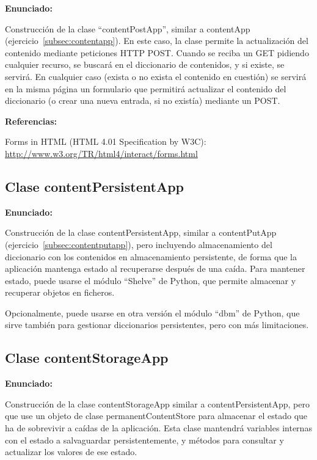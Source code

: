\textbf{Enunciado:}

Construcción de la clase ``contentPostApp'', similar a contentApp (ejercicio~\ref{subsec:contentapp}). En este caso, la clase permite la actualización del contenido mediante peticiones HTTP POST. Cuando se reciba un GET pidiendo cualquier recurso, se buscará en el diccionario de contenidos, y si existe, se servirá. En cualquier caso (exista o no exista el contenido en cuestión) se servirá en la misma página un formulario que permitirá actualizar el contenido del diccionario (o crear una nueva entrada, si no existía) mediante un POST.

\textbf{Referencias:}

Forms in HTML (HTML 4.01 Specification by W3C): \\
\url{http://www.w3.org/TR/html4/interact/forms.html}

\subsection{Clase contentPersistentApp}
\label{subsec:contentpersistentapp}

\textbf{Enunciado:}

Construcción de la clase contentPersistentApp, similar a contentPutApp (ejercicio~\ref{subsec:contentputapp}), pero incluyendo almacenamiento del diccionario con los contenidos en almacenamiento persistente, de forma que la aplicación mantenga estado al recuperarse después de una caída. Para mantener estado, puede usarse el módulo ``Shelve'' de Python, que permite almacenar y recuperar objetos en ficheros.

Opcionalmente, puede usarse en otra versión el módulo ``dbm'' de Python, que sirve también para gestionar diccionarios persistentes, pero con más limitaciones.

\subsection{Clase contentStorageApp}
\label{subsec:contentstorageapp}

\textbf{Enunciado:}

Construcción de la clase contentStorageApp similar a contentPersistentApp, pero que use un objeto de clase permanentContentStore para almacenar el estado que ha de sobrevivir a caídas de la aplicación. Esta clase mantendrá variables internas con el estado a salvaguardar persistentemente, y métodos para consultar y actualizar los valores de ese estado.

